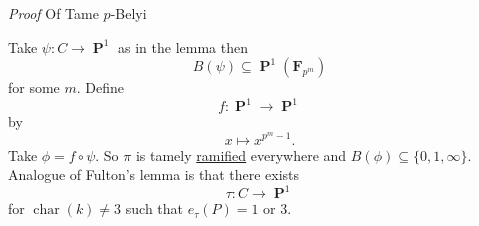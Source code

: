 \documentclass[10pt,]{book}
\makeatletter
\renewcommand*{\proofname}{Proof}
\renewenvironment{proof}[1][\proofname]{\par
  \pushQED{\qed}%
  \normalfont \topsep6\p@\@plus6\p@\relax
  \trivlist
  \item\relax
    {\itshape
    #1\@addpunct{.}}\hspace\labelsep\ignorespaces
}{%
  \popQED\endtrivlist\@endpefalse
}
\numberwithin{equation}{section}
\newcommand{\FF}{\mathbf{F}}
\DeclareMathOperator{\characteristic}{char}
\DeclareMathOperator{\PP}{\mathbf{P}}
\makeatother
\begin{document}
\begin{proof}\hypertarget{proof-102}{}
\hypertarget{p-753}{}%
Of Tame \(p\)-Belyi%
\par
\hypertarget{p-754}{}%
Take \(\psi \colon C\to \PP^1\) as in the lemma then%
\begin{equation*}
B(\psi) \subseteq \PP^1(\FF_{p^m})
\end{equation*}
for some \(m\). Define%
\begin{equation*}
f\colon \PP^1\to \PP^1
\end{equation*}
by%
\begin{equation*}
x\mapsto x^{p^m -1}\text{.}
\end{equation*}
Take \(\phi = f\circ \psi\). So \(\pi\) is tamely \hyperref[def-dess-ramified]{ramified} everywhere and \(B(\phi) \subseteq \{0,1,\infty\}\).%
\end{proof}
\hypertarget{p-755}{}%
Analogue of Fulton's lemma is that there exists%
\begin{equation*}
\tau \colon C\to \PP^1
\end{equation*}
for \(\characteristic (k) \ne 3\) such that \(e_\tau(P) = 1\) or \(3\).%
%
%
\typeout{************************************************}
\typeout{************************************************}
%
\end{document}
